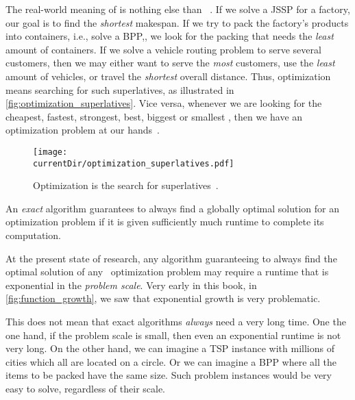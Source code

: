 The real-world meaning of  is nothing else than ~\cite{BB2009NO}.
If we solve a \gls{JSSP} for a factory, our goal is to find the \emph{shortest} makespan.
If we try to pack the factory's products into containers, i.e., solve a \gls{BPP},, we look for the packing that needs the \emph{least} amount of containers.
If we solve a vehicle routing problem to serve several customers, then we may either want to serve the \emph{most} customers, use the \emph{least} amount of vehicles, or travel the \emph{shortest} overall distance.
Thus, optimization means searching for such superlatives, as illustrated in \autoref{fig:optimization_superlatives}.
Vice versa, whenever we are looking for the cheapest, fastest, strongest, best, biggest or smallest , then we have an optimization problem at our hands~\cite{KBBDCGJLMPQSVBY2016GLPFOR}.%
%
\begin{figure}%
\centering%
\texttt{[image: \\currentDir/optimization\_superlatives.pdf]}%
\caption{Optimization is the search for superlatives~\cite{BB2009NO}.}%
\label{fig:optimization_superlatives}%
\end{figure}%
\endhsection%
%
\begin{definition}%
An \emph{exact} algorithm guarantees to always find a globally optimal solution for an optimization problem if it is given sufficiently much runtime to complete its computation.%
\end{definition}%
%
At the present state of research, any algorithm guaranteeing to always find the optimal solution of any \NPhard\ optimization problem may require a runtime that is exponential in the \emph{problem scale}.
Very early in this book, in \autoref{fig:function_growth}, we saw that exponential growth is very problematic.

This does not mean that exact algorithms \emph{always} need a very long time.
One the one hand, if the problem scale is small, then even an exponential runtime is not very long.
On the other hand, we can imagine a \gls{TSP} instance with millions of cities which all are located on a circle.
Or we can imagine a \gls{BPP} where all the items to be packed have the same size.
Such problem instances would be very easy to solve, regardless of their scale.

